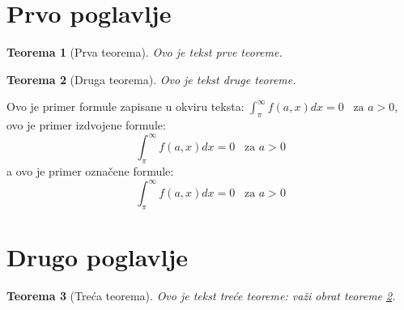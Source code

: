 \documentclass{article}
\newtheorem{teorema}{Teorema}[section]
\begin{document}
\setcounter{equation}{500}
\section{Prvo poglavlje}
\begin{teorema}[Prva teorema]
Ovo je tekst prve teoreme.
\end{teorema}
\begin{teorema}[Druga teorema]
\label{thm:druga_teorema}
Ovo je tekst druge teoreme.
\end{teorema}
Ovo je primer formule zapisane u okviru teksta:
$\int_{\pi}^{\infty} f(a,x)dx = 0 \;\;\; \mbox{za $a>0$}$,
ovo je primer izdvojene formule:
$$\int_{\pi}^{\infty} f(a,x)dx = 0 \;\;\; \mbox{za $a>0$}$$
a ovo je primer označene formule:
\begin{equation}
\int_{\pi}^{\infty} f(a,x)dx = 0 \;\;\; \mbox{za $a>0$}
\end{equation}
\section{Drugo poglavlje}
\begin{teorema}[Treća teorema]
Ovo je tekst treće teoreme: važi obrat teoreme
\ref{thm:druga_teorema}.
\end{teorema}
\end{document}
